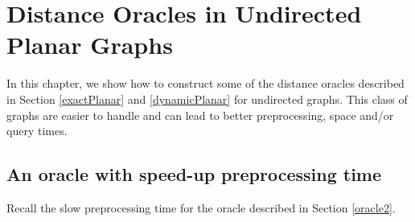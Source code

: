 \section{Distance Oracles in Undirected Planar Graphs}
In this chapter, we show how to construct some of the distance oracles described in Section
\ref{exactPlanar} and \ref{dynamicPlanar} for undirected graphs. This class of graphs are
easier to handle and can lead to better preprocessing, space and/or query times.

\subsection{An oracle with speed-up preprocessing time}
Recall the slow preprocessing time for the oracle described in Section \ref{oracle2}.
